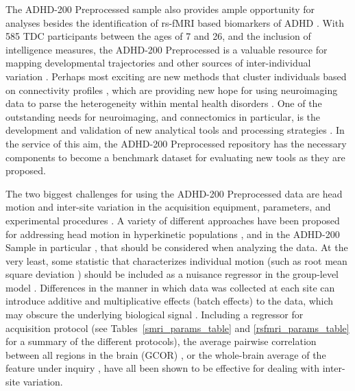 \documentclass[preprint,12pt,3p]{elsarticle}
\begin{document}
\par
The ADHD-200 Preprocessed sample also provides ample opportunity for analyses besides the identification of rs-fMRI based biomarkers of ADHD \cite{craddock2015}. With 585 TDC participants between the ages of 7 and 26, and the inclusion of intelligence measures, the ADHD-200 Preprocessed is a valuable resource for mapping developmental trajectories \cite{dosenbach2010, zuo2010, dimartino2014} and other sources of inter-individual variation \cite{kelly2012}. Perhaps most exciting are new methods that cluster individuals based on connectivity profiles \cite{miranda2014connectotyping, finn2015fingerprinting}, which are providing new hope for using neuroimaging data to parse the heterogeneity within mental health disorders \cite{castellanos2013}. One of the outstanding needs for neuroimaging, and connectomics in particular, is the development and validation of new analytical tools and processing strategies \cite{craddock2013,varoquaux2013,craddock2015}. In the service of this aim, the ADHD-200 Preprocessed repository has the necessary components to become a benchmark dataset for evaluating new tools as they are proposed.
\par
The two biggest challenges for using the ADHD-200 Preprocessed data are head motion \cite{power2012, vandijk2012, sattertwhaite2012, fair2012adhd200, yan2013motion, yan2013small} and inter-site variation in the acquisition equipment, parameters, and experimental procedures \cite{Olivetti2012,yan2013std}. A variety of different approaches have been proposed for addressing head motion in hyperkinetic populations \cite{power2012, sattertwhaite2013}, and in the ADHD-200 Sample in particular \cite{fair2012adhd200}, that should be considered when analyzing the data. At the very least, some statistic that characterizes individual motion (such as root mean square deviation \cite{JenkinsonTR99}) should be included as a nuisance regressor in the group-level model \cite{sattertwhaite2012, yan2013motion}. Differences in the manner in which data was collected at each site can introduce additive and multiplicative effects (batch effects) to the data, which may obscure the underlying biological signal \cite{Olivetti2012,yan2013std}. Including a regressor for acquisition protocol (see Tables~\ref{smri_params_table} and \ref{rsfmri_params_table} for a summary of the different protocols), the average pairwise correlation between all regions in the brain (GCOR) \cite{saad2013gcor}, or the whole-brain average of the feature under inquiry \cite{yan2013std}, have all been shown to be effective for dealing with inter-site variation. 
\end{document}
